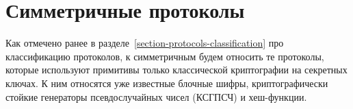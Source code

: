 \section{Симметричные протоколы}

Как отмечено ранее в разделе~\ref{section-protocols-classification} про классификацию протоколов, к симметричным будем относить те протоколы, которые используют примитивы только классической криптографии на секретных ключах. К ним относятся уже известные блочные шифры, криптографически стойкие генераторы псевдослучайных чисел (КСГПСЧ) и хеш-функции.








